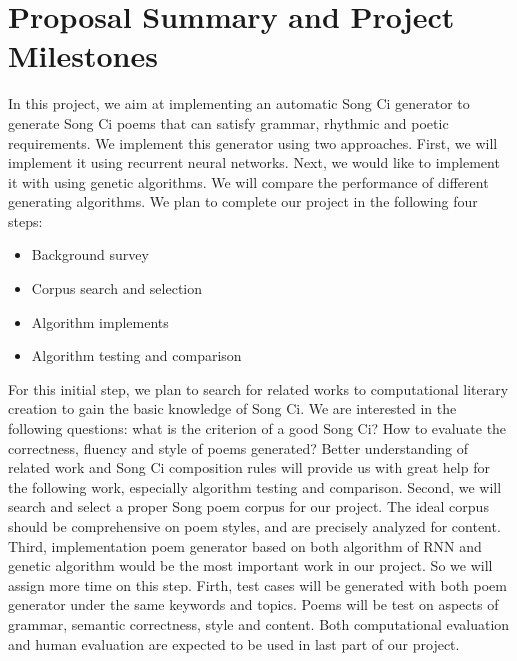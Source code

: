 \section{Proposal Summary and Project Milestones}
In this project, we aim at implementing an automatic Song Ci generator to generate Song Ci poems that can satisfy grammar, rhythmic and poetic requirements.
%
We implement this generator using two approaches. First, we will implement it using recurrent neural networks.
%
Next, we would like to implement it with using genetic algorithms.
%
We will compare the performance of different generating algorithms.
%
We plan to complete our project in the following four steps:

\begin{itemize}
\item Background survey
\item Corpus search and selection
\item Algorithm implements
\item Algorithm testing and comparison
\end{itemize}

For this initial step, we plan to search for related works to computational literary creation to gain the basic knowledge of Song Ci.
%
We are interested in the following questions: what is the criterion of a good Song Ci? How to evaluate the correctness, fluency and style of poems generated?
%
Better understanding of related work and Song Ci composition rules will provide us with great help for the following work, especially algorithm testing and comparison. 
%
Second, we will search and select a proper Song poem corpus for our project. The ideal corpus should be comprehensive on poem styles, and are precisely analyzed for content. 
%
Third, implementation poem generator based on both algorithm of RNN and genetic algorithm would be the most important work in our project. So we will assign more time on this step. 
%
Firth, test cases will be generated with both poem generator under the same keywords and topics. Poems will be test on aspects of grammar, semantic correctness, style and content. Both computational evaluation and human evaluation are expected to be used in last part of our project.


